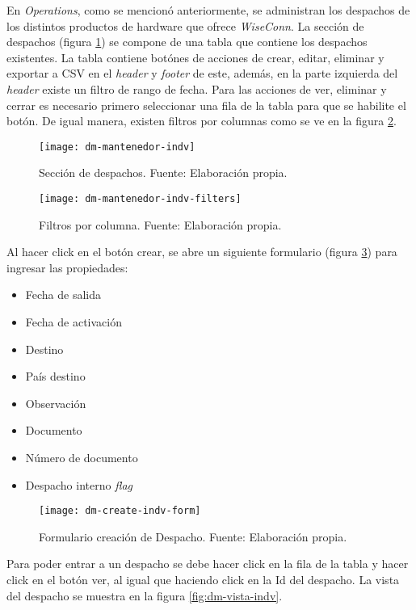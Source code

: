 En \textit{Operations}, como se mencionó anteriormente, se administran los despachos de los distintos productos de hardware que ofrece \textit{WiseConn}.
La sección de despachos (figura \ref{fig:dm-mantenedor-indv}) se compone de una tabla que contiene los despachos existentes. La tabla contiene botónes de acciones de crear, editar, eliminar y exportar a CSV en el \textit{header} y \textit{footer} de este, además, en la parte izquierda del \textit{header} existe un filtro de rango de fecha. 
Para las acciones de ver, eliminar y cerrar es necesario primero seleccionar una fila de la tabla para que se habilite el botón.
De igual manera, existen filtros por columnas como se ve en la figura \ref{fig:dm-mantenedor-indv-filters}.

\begin{figure}[H]
	\centering
	\texttt{[image: dm-mantenedor-indv]}
	\caption{\label{fig:dm-mantenedor-indv} Sección de despachos. Fuente: Elaboración propia.}
\end{figure}

\begin{figure}[H]
	\centering
	\texttt{[image: dm-mantenedor-indv-filters]}
	\caption{\label{fig:dm-mantenedor-indv-filters} Filtros por columna. Fuente: Elaboración propia.}
\end{figure}

Al hacer click en el botón crear, se abre un siguiente formulario (figura \ref{fig:dm-create-indv-form}) para ingresar las propiedades:
\begin{itemize}
    \item Fecha de salida
    \item Fecha de activación
    \item Destino
    \item País destino
    \item Observación
    \item Documento
    \item Número de documento
    \item Despacho interno \textit{flag}    
\end{itemize}

\begin{figure}[H]
	\centering
	\texttt{[image: dm-create-indv-form]}
	\caption{\label{fig:dm-create-indv-form} Formulario creación de Despacho. Fuente: Elaboración propia.}
\end{figure}

Para poder entrar a un despacho se debe hacer click en la fila de la tabla y hacer click en el botón ver, al igual que haciendo click en la Id del despacho.
La vista del despacho se muestra en la figura \ref{fig:dm-vista-indv}.

